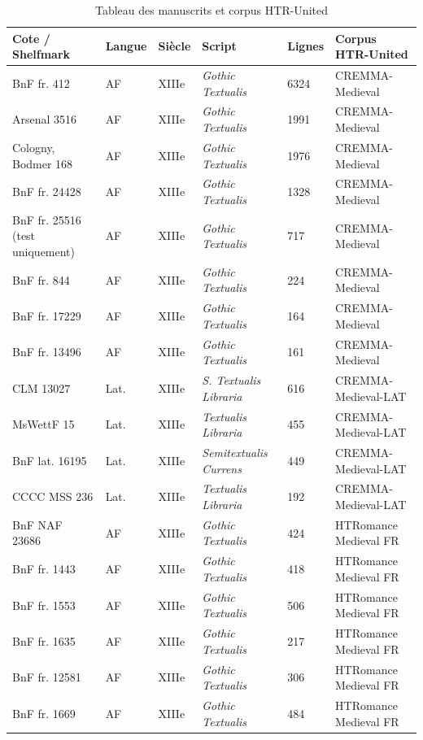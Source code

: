 ﻿\documentclass[twoside,twocolumn,10pt]{article}
\begin{document}
\begin{appendices}
\begin{table}[H]
\fontsize{10}{11}\selectfont
\centering
\caption{Tableau des manuscrits et corpus HTR-United}
\begin{tabular}{L{4cm}|C{1cm}|C{1cm}|C{3.5cm}|C{1cm}|C{4.5cm}}
\toprule
Cote / Shelfmark & Langue & Siècle & Script & Lignes & Corpus HTR-United \\
\midrule
BnF fr. 412 & AF & XIIIe & \textit{Gothic Textualis} & 6324 & CREMMA-Medieval \\
Arsenal 3516 & AF & XIIIe & \textit{Gothic Textualis} & 1991 & CREMMA-Medieval \\
Cologny, Bodmer 168 & AF & XIIIe & \textit{Gothic Textualis} & 1976 & CREMMA-Medieval \\
BnF fr. 24428 & AF & XIIIe & \textit{Gothic Textualis} & 1328 & CREMMA-Medieval \\
BnF fr. 25516 (test uniquement) & AF & XIIIe & \textit{Gothic Textualis} & 717 & CREMMA-Medieval \\
BnF fr. 844 & AF & XIIIe & \textit{Gothic Textualis} & 224 & CREMMA-Medieval \\
BnF fr. 17229 & AF & XIIIe & \textit{Gothic Textualis} & 164 & CREMMA-Medieval \\
BnF fr. 13496 & AF & XIIIe & \textit{Gothic Textualis} & 161 & CREMMA-Medieval \\
CLM 13027 & Lat. & XIIIe & \textit{S. Textualis Libraria} & 616 & CREMMA-Medieval-LAT \\
MsWettF 15 & Lat. & XIIIe & \textit{Textualis Libraria} & 455 & CREMMA-Medieval-LAT \\
BnF lat. 16195 & Lat. & XIIIe & \textit{Semitextualis Currens} & 449 & CREMMA-Medieval-LAT \\
CCCC MSS 236 & Lat. & XIIIe & \textit{Textualis Libraria} & 192 & CREMMA-Medieval-LAT \\
BnF NAF 23686 & AF & XIIIe & \textit{Gothic Textualis} & 424 & HTRomance Medieval FR \\
BnF fr. 1443 & AF & XIIIe & \textit{Gothic Textualis} & 418 & HTRomance Medieval FR \\
BnF fr. 1553 & AF & XIIIe & \textit{Gothic Textualis} & 506 & HTRomance Medieval FR \\
BnF fr. 1635 & AF & XIIIe & \textit{Gothic Textualis} & 217 & HTRomance Medieval FR \\
BnF fr. 12581 & AF & XIIIe & \textit{Gothic Textualis} & 306 & HTRomance Medieval FR \\
BnF fr. 1669 & AF & XIIIe & \textit{Gothic Textualis} & 484 & HTRomance Medieval FR \\

\end{tabular}
\end{table}
\end{appendices}
\end{document}
